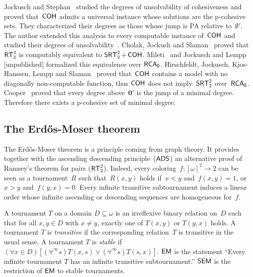 Jockusch and Stephan~\cite{Jockusch1993cohesive} studied the degrees of unsolvability of cohesiveness
and proved that~$\operatorname{\sf{COH}}$ admits a universal instance whose solutions
are the p-cohesive sets. They characterized their degrees as those whose
jump is PA relative to~$\emptyset'$.
The author extended this analysis to every computable instance of~$\operatorname{\sf{COH}}$ and studied their degrees
of unsolvability~\cite{Patey2016weakness}.
Cholak, Jockush and Slaman~\cite{Cholak2001strength} proved that $\operatorname{\sf{RT}}^2_2$ is computably equivalent to $\operatorname{\sf{SRT}}^2_2+\operatorname{\sf{COH}}$.
Mileti~\cite{Mileti2004Partition} and Jockusch and Lempp [unpublished]
formalized this equivalence over $\operatorname{\sf{RCA}_0}$.
Hirschfeldt, Jockusch, Kjos-Hanssen, Lempp and Slaman~\cite{Hirschfeldt2008strength} proved that~$\operatorname{\sf{COH}}$ contains a model
with no diagonally non-computable function, thus $\operatorname{\sf{COH}}$ does not imply~$\operatorname{\sf{SRT}}^2_2$ over~$\operatorname{\sf{RCA}_0}$.
Cooper~\cite{Cooper1973Minimal} proved that every degree above~$\mathbf{0'}$ is the jump of a minimal degree.
Therefore there exists a p-cohesive set of minimal degree.

\subsection{The Erd\H{o}s-Moser theorem}

The Erd\H{o}s-Moser theorem is a principle coming from graph theory.
It provides together with the ascending descending principle~($\operatorname{\sf{ADS}}$) an alternative proof of
Ramsey's theorem for pairs ($\operatorname{\sf{RT}}^2_2$). Indeed, every coloring~$f : [\omega]^2 \to 2$
can be seen as a tournament~$R$ such that~$R(x,y)$ holds if~$x < y$ and~$f(x,y) = 1$, or~$x > y$ and~$f(y, x) = 0$.
Every infinite transitive subtournament induces a linear order whose infinite ascending or descending
sequences are homogeneous for~$f$.

\begin{definition}
A tournament $T$ on a domain $D \subseteq \omega$ is an irreflexive binary relation on~$D$ such that for all $x,y \in D$ with $x \not= y$, exactly one of $T(x,y)$ or $T(y,x)$ holds. A tournament $T$ is \emph{transitive} if the corresponding relation~$T$ is transitive in the usual sense. A tournament $T$ is \emph{stable} if $(\forall x \in D)[(\forall^{\infty} s) T(x,s) \vee (\forall^{\infty} s) T(s, x)]$.
$\operatorname{\sf{EM}}$ is the statement ``Every infinite tournament $T$ has an infinite transitive subtournament.''
$\operatorname{\sf{SEM}}$ is the restriction of $\operatorname{\sf{EM}}$ to stable tournaments.
\end{definition}

